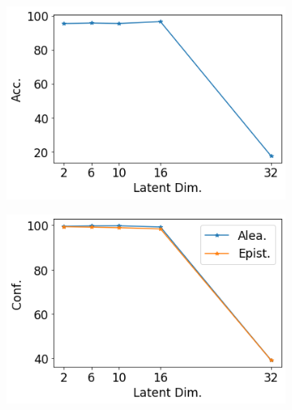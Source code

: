 \begin{figure}[ht]
    \centering
    \begin{subfigure}[t]{0.33 \textwidth}
        \centering
        \includegraphics[width=1. \textwidth]{sections/006_neurips2020/figures/lat_dim_seg_acc.png}
    \end{subfigure}%
    \begin{subfigure}[t]{0.33 \textwidth}
        \centering
        \includegraphics[width=1. \textwidth]{sections/006_neurips2020/figures/lat_dim_seg_conf.png}
    \end{subfigure}%
    

\end{figure}

